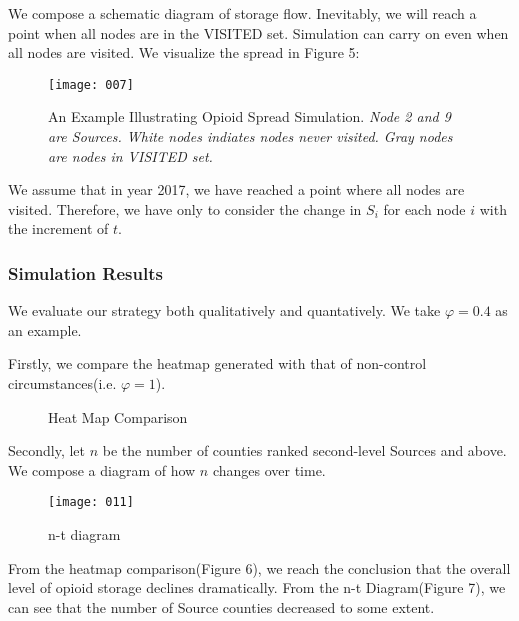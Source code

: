 We compose a schematic diagram of storage flow. Inevitably, we will reach a point when all nodes are in the VISITED set. Simulation can carry on even when all nodes are visited. We visualize the spread in Figure 5:

\begin{figure}[H]
	\centering
	\texttt{[image: 007]}
	\caption{An Example Illustrating Opioid Spread Simulation. \textit{Node 2 and 9 are Sources. White nodes indiates nodes never visited. Gray nodes are nodes in VISITED set.}}
\end{figure}

We assume that in year 2017, we have reached a point where all nodes are visited. Therefore, we have only to consider the change in $S_i$ for each node $i$ with the increment of $t$. 

\subsubsection{Simulation Results}
We evaluate our strategy both qualitatively and quantatively. We take $\varphi = 0.4$ as an example.

Firstly, we compare the heatmap generated with that of non-control circumstances(i.e. $\varphi=1$). 

\begin{figure}[H]
	\centering
	\caption{Heat Map Comparison}
\end{figure}
	
Secondly, let $n$ be the number of counties ranked second-level Sources and above. We compose a diagram of how $n$ changes over time. 

\begin{figure}[H]
	\centering
	\texttt{[image: 011]}
	\caption{n-t diagram}
\end{figure}

From the heatmap comparison(Figure 6), we reach the conclusion that the overall level of opioid storage declines dramatically. From the n-t Diagram(Figure 7), we can see that the number of Source counties decreased to some extent. 

